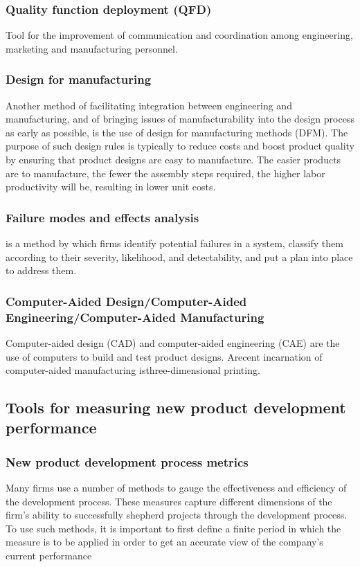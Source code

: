 \documentclass[12pt]{article}
\begin{document}
\subsubsection{Quality function deployment (QFD)}
Tool for the improvement of communication and coordination among engineering, marketing and manufacturing personnel.
\subsubsection{Design for manufacturing}
Another method of facilitating integration between engineering and manufacturing,
and of bringing issues of manufacturability into the design process as early as possible,
is the use of design for manufacturing methods (DFM).
The purpose of such design rules is typically to reduce
costs and boost product quality by ensuring that product designs are easy to manufacture. The easier products are to manufacture, the fewer the assembly steps required, the
higher labor productivity will be, resulting in lower unit costs.
\subsubsection{Failure modes and effects analysis}
is a method by which firms identify
potential failures in a system, classify them according to their severity, likelihood, and
detectability, and put a plan into place to address them.

\subsubsection{Computer-Aided Design/Computer-Aided\\Engineering/Computer-Aided Manufacturing}
Computer-aided design (CAD) and computer-aided engineering (CAE) are the use of
computers to build and test product designs.
Arecent incarnation of computer-aided manufacturing isthree-dimensional printing.

\subsection{Tools for measuring new product development performance}
\subsubsection{New product development process metrics}
Many firms use a number of methods to gauge the effectiveness and efficiency of the
development process. These measures capture different dimensions of the firm's ability to
successfully shepherd projects through the development process. To use such methods, it
is important to first define a finite period in which the measure is to be applied in order
to get an accurate view of the company's current performance
\end{document}
